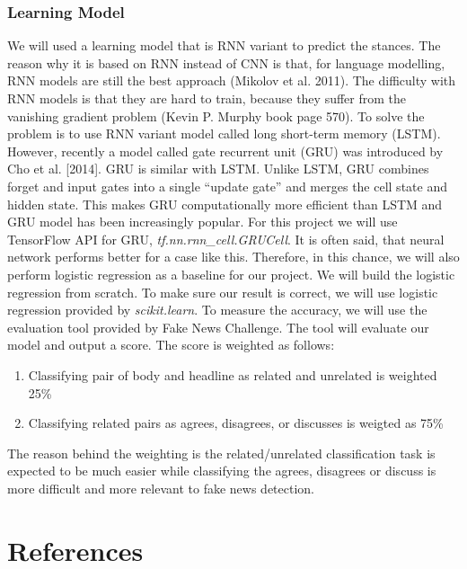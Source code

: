 \documentclass[12pt]{article}
\begin{document}
\subsubsection{Learning Model}
We will used a learning model that is  RNN variant to predict the stances. 
The reason why it is based on RNN instead of CNN is that, for language 
modelling, RNN models are still the best approach (Mikolov et al. 2011).
The difficulty with RNN models is that they are hard to train, because they 
suffer from the vanishing gradient problem (Kevin P. Murphy book page 570). 
To solve the problem is to use RNN variant model called long short-term 
memory (LSTM). 
However, recently a model called gate recurrent unit (GRU) was introduced by 
Cho et al. [2014].
GRU is similar with LSTM. Unlike LSTM, GRU combines forget and input gates 
into a single “update gate” and merges the cell state and hidden state.
This makes GRU computationally more efficient than LSTM and GRU model has 
been increasingly popular. For this project we will use TensorFlow API for GRU,
\textit{tf.nn.rnn\_cell.GRUCell}. 
It is often said, that neural network performs better for a case like this. 
Therefore, in this chance, we will also perform logistic regression as a 
baseline for our project. We will build the logistic regression from scratch.
To make sure our result is correct, we will use logistic regression provided by
\textit{scikit.learn}.
To measure the accuracy, we will use the evaluation tool provided by 
Fake News Challenge. The tool will evaluate our model and output a score. 
The score is weighted as follows:
\begin{enumerate}
    \item Classifying pair of body and headline as related and unrelated is 
      weighted 25\%
    \item Classifying related pairs as agrees, disagrees, or discusses is 
      weigted as 75\%
\end{enumerate}
The reason behind the weighting is the related/unrelated classification task is
expected to be much easier while classifying the agrees, disagrees or discuss 
is more difficult and more relevant to fake news detection.

\section{References}
\end{document}

